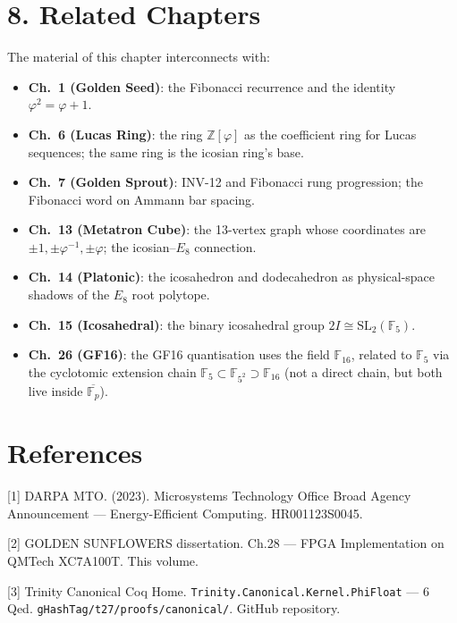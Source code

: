\section{8. Related Chapters}\label{sec:related}

The material of this chapter interconnects with:
\begin{itemize}
  \item \textbf{Ch.~1 (Golden Seed)}: the Fibonacci
        recurrence and the identity
        \(\varphi^2 = \varphi + 1\).
  \item \textbf{Ch.~6 (Lucas Ring)}: the ring
        \(\mathbb{Z}[\varphi]\) as the coefficient
        ring for Lucas sequences; the same ring is
        the icosian ring's base.
  \item \textbf{Ch.~7 (Golden Sprout)}: INV-12
        and Fibonacci rung progression; the
        Fibonacci word on Ammann bar spacing.
  \item \textbf{Ch.~13 (Metatron Cube)}: the
        13-vertex graph whose coordinates are
        \(\pm 1, \pm\varphi^{-1}, \pm\varphi\);
        the icosian--\(E_8\) connection.
  \item \textbf{Ch.~14 (Platonic)}: the icosahedron
        and dodecahedron as physical-space shadows
        of the \(E_8\) root polytope.
  \item \textbf{Ch.~15 (Icosahedral)}: the binary
        icosahedral group \(2I \cong \mathrm{SL}_2(\mathbb{F}_5)\).
  \item \textbf{Ch.~26 (GF16)}: the GF16 quantisation
        uses the field \(\mathbb{F}_{16}\), related
        to \(\mathbb{F}_5\) via the cyclotomic
        extension chain \(\mathbb{F}_5 \subset
        \mathbb{F}_{5^2} \supset \mathbb{F}_{16}\)
        (not a direct chain, but both live inside
        \(\overline{\mathbb{F}_p}\)).
\end{itemize}

\section{References}\label{sec:references-ch08}\label{references}

[1] DARPA MTO. (2023). Microsystems Technology
Office Broad Agency Announcement ---
Energy-Efficient Computing. HR001123S0045.

[2] GOLDEN SUNFLOWERS dissertation. Ch.28 ---
FPGA Implementation on QMTech XC7A100T. This
volume.

[3] Trinity Canonical Coq Home.
\texttt{Trinity.Canonical.Kernel.PhiFloat} --- 6
Qed. \texttt{gHashTag/t27/proofs/canonical/}.
GitHub repository.

